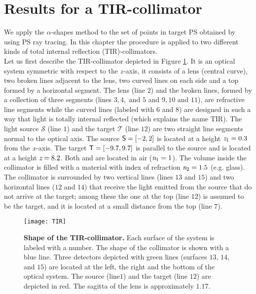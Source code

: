 \section{Results for a TIR-collimator}\label{sec:results-Tir-alpha}
We apply the $\alpha$-shapes method to the set of points in target PS obtained by using PS ray tracing.
In this chapter the procedure is applied to two different kinds of total internal reflection (TIR)-collimators.\\ \indent  
Let us first describe the TIR-collimator depicted in Figure \ref{fig:tir}. It is an optical system symmetric with respect to the $z$-axis, it consists of a lens (central curve), two broken lines adjacent to the lens,
two curved lines on each side and a top formed by a horizontal segment. The lens (line $2$) and the broken lines, formed by a collection of three segments (lines $3, 4, \mbox{ and } 5$ and $9, 10 \mbox{ and } 11$), are refractive line segments while the curved lines (labeled with $6$ and $8$) are designed in such a way that light is totally internal reflected (which explains the name TIR).
The light source $\mathcal{S}$ (line $1$) and the target $\mathcal{T}$ (line $12$) are two straight line segments normal to the optical axis.
The source $\textsf{S}= [-2,2]$ is located at a height $\textit{z}_{1} = 0.3$ from the $\textit{x}$-axis.
 The target $\textsf{T}= [-9.7, 9.7]$ is parallel to the source and is located at a height $ \textit{z}= 8.2$. Both  and  are located in air ($\textit{n}_1=1$).
The volume inside the collimator is filled with a material with index of refraction $\textit{n}_2=1.5$ (e.g. glass).
The collimator is surrounded by two vertical lines (lines $13$ and $15$) and two horizontal lines ($12$ and $14$) that receive the light emitted from the source that do not arrive at the target; among these the one at the top (line $12$) is assumed to be the target, and it is located at a small distance from the top (line $7$). 
\begin{figure}[h]
  \begin{center}
  \texttt{[image: TIR]}
  \end{center}
  \caption{\textbf{Shape of the TIR-collimator.} Each surface of the system is labeled with a number.
   The shape of the collimator is shown with a blue line.
   Three detectors depicted with green lines (surfaces $13$, $14$, and $15$) are located at the left, the right and the bottom of the optical system. The source (line$1$) and the target (line $12$) are depicted in red.
The sagitta of the lens is approximately $1.17$.}
  \label{fig:tir}
\end{figure}
